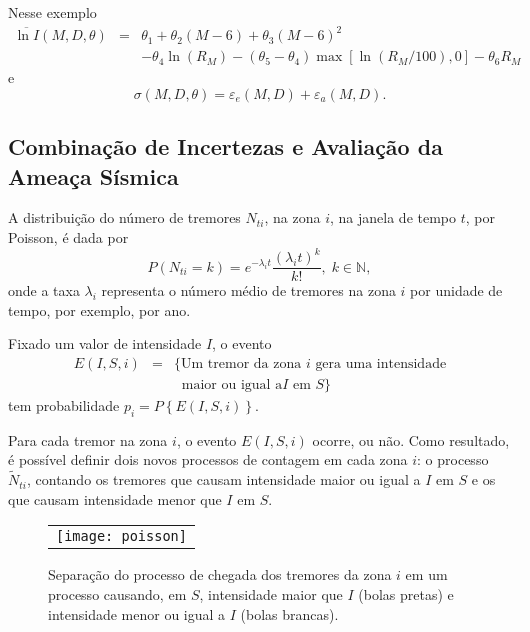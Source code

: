 Nesse exemplo 
\begin{equation}
\begin{array}{lcl}
\overline{\ln I}(M, D, \theta) & = & \theta_1 + \theta_2(M-6) + \theta_3(M-6)^2  \\
& & - \theta_4\ln (R_M)
-(\theta_5 - \theta_4)\max\left[ \ln\left( R_M / 100 \right), 0 \right]
-\theta_6 R_M
\end{array}
\end{equation}
e 
\begin{equation}
	\sigma(M, D, \theta)=\varepsilon_e(M,D) + \varepsilon_a(M,D).
\end{equation}


\subsection{Combinação de Incertezas e Avaliação da Ameaça Sísmica}
\label{sec:hazard}

A distribuição do número de tremores $N_{t i}$, na zona $i$, na janela de tempo $t$, por Poisson,
é dada por 
$$
P(N_{t i}=k)=e^{-\lambda_i t} \frac{(\lambda_i t)^k}{k!},\;k \in \mathbb{N},
$$
onde a taxa $\lambda_i$ representa o número médio de tremores na zona
$i$ por unidade de tempo, por exemplo, por ano.

Fixado um valor de intensidade $I$, o evento
\begin{equation} \label{formulapi}
\begin{array}{lll}
E(I, S, i)  & =  & \{ \mbox{Um tremor da zona }i \mbox{ gera uma intensidade} \\
&  &  \;\;\mbox{maior ou igual a} I \mbox{ em }S \}
\end{array}
\end{equation}
tem probabilidade $p_i=P \left\{ E(I, S, i)\right\}$.

Para cada tremor na zona $i$, o evento $E(I, S, i)$ ocorre, ou não.
Como resultado, é possível definir dois novos processos de contagem
em cada zona $i$: o processo $\tilde N_{t i}$, contando os tremores que 
causam intensidade maior ou igual a $I$ em $S$ e os que causam intensidade menor que $I$ em $S$.

\begin{figure}[H]
	\centering
	\begin{tabular}{l}
	\texttt{[image: poisson]}
	\end{tabular}
	\caption{Separação do processo de chegada dos tremores da zona $i$ 
	em um processo causando, em $S$, intensidade maior que $I$ (bolas pretas) e intensidade 
	menor ou igual a $I$ (bolas brancas).}
\label{fig:poisson}
\end{figure}

